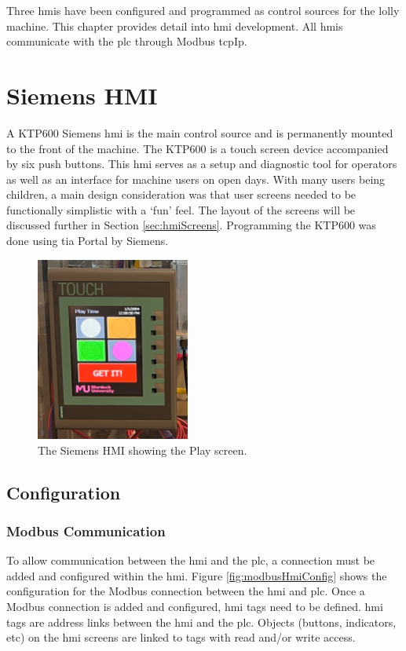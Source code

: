 Three \acrshort{hmi}s have been configured and programmed as control sources for the lolly machine. This chapter provides detail into \acrshort{hmi} development. All \acrshort{hmi}s communicate with the \acrshort{plc} through Modbus \acrshort{tcpIp}.

\section{Siemens HMI}
    A KTP600 Siemens \acrshort{hmi} is the main control source and is permanently mounted to the front of the machine. The KTP600 is a touch screen device accompanied by six push buttons.  This \acrshort{hmi} serves as a setup and diagnostic tool for operators as well as an interface for machine users on open days. With many users being children, a main design consideration was that user screens needed to be functionally simplistic with a `fun' feel. The layout of the screens will be discussed further in Section \ref{sec:hmiScreens}. Programming the KTP600 was done using \acrfull{tia} Portal by Siemens.

        \begin{figure}[H]
            \centering
            \includegraphics[width = 0.45\textwidth]{2_images/hmiInstalled}
            \caption{The Siemens HMI showing the Play screen.}
            \label{fig:hmiInstalled}
        \end{figure}    
    
    \subsection{Configuration}
        \subsubsection{Modbus Communication}
            To allow communication between the \acrshort{hmi} and the \acrshort{plc}, a connection must be added and configured within the \acrshort{hmi}. Figure \ref{fig:modbusHmiConfig} shows the configuration for the Modbus connection between the \acrshort{hmi} and \acrshort{plc}. Once a Modbus connection is added and configured, \acrshort{hmi} tags need to be defined. \acrshort{hmi} tags are address links between the \acrshort{hmi} and the \acrshort{plc}. Objects (buttons, indicators, etc) on the \acrshort{hmi} screens are linked to tags with read and/or write access. 
            
